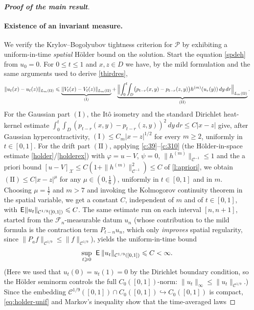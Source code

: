 \documentclass[12pt]{article}
\theoremstyle{definition}
\DeclareMathOperator{\1}{\mathbbm{1}}%
\def\E{\hskip.15ex\mathsf{E}\hskip.10ex}
\def\phi{\varphi}
\renewcommand{\ge}{\geqslant}
\renewcommand{\le}{\leqslant}
\newcommand{\C}{\mathcal{C}}
\newcommand{\F}{\mathcal{F}}
\newcommand{\PP}{\mathcal{P}}
\newcommand{\X}{\mathcal{X}}
\begin{document}
\begin{proof}[\textbf{Proof of the main result}]
\paragraph{Existence of an invariant measure.}
We verify the Krylov--Bogolyubov tightness criterion for $\PP$ by exhibiting a uniform-in-time
\emph{spatial} H\"older bound on the solution. Start the equation \eqref{spdeh} from
$u_0=0$. For $0\le t\le 1$ and $x,z\in D$ we have, by the mild formulation and the same
arguments used to derive \eqref{thirdres},
\begin{equation}\label{eq:spatial-incr}
\|u_t(x)-u_t(z)\|_{L_m(\Omega)}
\le \underbrace{\|V_t(x)-V_t(z)\|_{L_m(\Omega)}}_{(\mathrm I)}
+\underbrace{\Bigl\|\int_0^t\!\!\int_D\bigl(p_{t-r}(x,y)-p_{t-r}(z,y)\bigr)h^{(m)}(u_r(y))\,dy\,dr\Bigr\|_{L_m(\Omega)}}_{(\mathrm{II})} .
\end{equation}
For the Gaussian part $(\mathrm I)$, the It\^o isometry and the standard Dirichlet heat-kernel
estimate $\int_0^t\!\int_D(p_{t-r}(x,y)-p_{t-r}(z,y))^2\,dy\,dr\le C|x-z|$ give, after
Gaussian hypercontractivity, $(\mathrm I)\le C_m|x-z|^{1/2}$ for every $m\ge2$, uniformly in
$t\in[0,1]$. For the drift part $(\mathrm{II})$, applying \cref{c:39}--\cref{c:310} (the
H\"older-in-space estimate \eqref{holder}/\eqref{holderex}) with $\phi=u-V$, $\psi=0$,
$\|h^{(m)}\|_{\C^{-1}}\le1$ and the a priori bound $[u-V]_{\X}\le C(1+\|h^{(m)}\|^2_{\C^{-1}})\le C$
of \cref{l:apriori}, we obtain $(\mathrm{II})\le C|x-z|^{\mu}$ for any $\mu\in(0,\tfrac16)$,
uniformly in $t\in[0,1]$ and in $m$. Choosing $\mu=\tfrac17$ and $m>7$ and invoking the
Kolmogorov continuity theorem in the spatial variable, we get a constant $C$, independent of
$m$ and of $t\in[0,1]$, with $\E\|u_t\|_{\C^{1/9}([0,1])}\le C$. The same estimate run on each
interval $[n,n+1]$, started from the $\F_n$-measurable datum $u_n$ (whose contribution to the
mild formula is the contraction term $P_{t-n}u_n$, which only \emph{improves} spatial
regularity, since $\|P_a f\|_{\C^{1/9}}\le \|f\|_{\C^{1/9}}$), yields the uniform-in-time bound
\begin{equation}\label{eq:holder-unif}
\sup_{t\ge0}\ \E\,\|u_t\|_{\C^{1/9}([0,1])}\le C<\infty .
\end{equation}
(Here we used that $u_t(0)=u_t(1)=0$ by the Dirichlet boundary condition, so the H\"older
seminorm controls the full $C_0([0,1])$-norm: $\|u_t\|_\infty\le \|u_t\|_{\C^{1/9}}$.)
Since the embedding $\C^{1/9}([0,1])\cap C_0([0,1])\hookrightarrow C_0([0,1])$ is compact,
\eqref{eq:holder-unif} and Markov's inequality show that the time-averaged laws

\end{proof}
\end{document}

